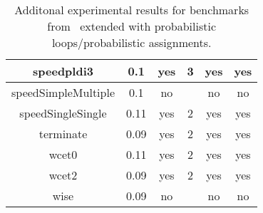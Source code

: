 \begin{center}
\begin{table}[]
\begin{tabular}{c|c|c|c|c|c}
{speedpldi3} & {0.1} & {yes} & {3} & {yes} & {yes} \\\hline
{speedSimpleMultiple} & {0.1} & {no} & {} & {no} & {no} \\\hline
{speedSingleSingle} & {0.11} & {yes} & {2} & {yes} & {yes} \\\hline
{terminate} & {0.09} & {yes} & {2} & {yes} & {yes} \\\hline
{wcet0} & {0.11} & {yes} & {2} & {yes} & {yes} \\\hline
{wcet2} & {0.09} & {yes} & {2} & {yes} & {yes} \\\hline
{wise} & {0.09} & {no} & {} & {no} & {no} \\\hline
    \end{tabular}
    \caption{Additonal experimental results for benchmarks from~\cite{ADFG10:lexicographic} extended with probabilistic loops/probabilistic assignments.}
    \label{tab:exp3}
\end{table}
\end{center}


